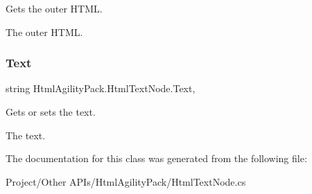 Gets the outer H\+T\+ML. 

The outer H\+T\+ML.\mbox{\label{class_html_agility_pack_1_1_html_text_node_ae5d4da856a540bd9b275e5ae9aa38e28}} 
\subsubsection{\texorpdfstring{Text}{Text}}
{\footnotesize\ttfamily string Html\+Agility\+Pack.\+Html\+Text\+Node.\+Text\hspace{0.3cm}{\ttfamily [get]}, {\ttfamily [set]}}



Gets or sets the text. 

The text.

The documentation for this class was generated from the following file\+:\begin{DoxyCompactItemize}
\item 
Project/\+Other A\+P\+Is/\+Html\+Agility\+Pack/Html\+Text\+Node.\+cs\end{DoxyCompactItemize}
